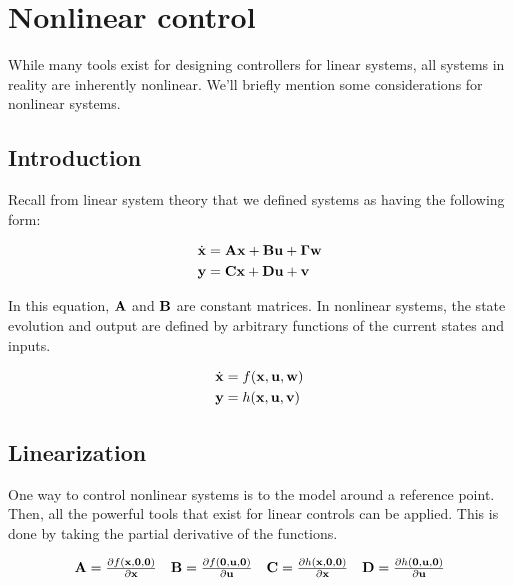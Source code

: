 
\chapter{Nonlinear control}
\label{ch:nonlinear_control}

While many tools exist for designing controllers for linear \glspl{system}, all
\glspl{system} in reality are inherently nonlinear. We'll briefly mention some
considerations for nonlinear \glspl{system}.

\section{Introduction}

Recall from linear \gls{system} theory that we defined \glspl{system} as having
the following form:

\begin{align*}
  \dot{\mathbf{x}} &= \mathbf{A}\mathbf{x} + \mathbf{B}\mathbf{u} + \mathbf{\Gamma}\mathbf{w} \\
  \mathbf{y} &= \mathbf{C}\mathbf{x} + \mathbf{D}\mathbf{u} + \mathbf{v}
\end{align*}

In this equation, $\mathbf{A}$ and $\mathbf{B}$ are constant matrices. In nonlinear
\glspl{system}, the \gls{state} evolution and \gls{output} are defined by
arbitrary functions of the current \glspl{state} and \glspl{input}.

\begin{align*}
  \dot{\mathbf{x}} &= f(\mathbf{x}, \mathbf{u}, \mathbf{w}) \\
  \mathbf{y} &= h(\mathbf{x}, \mathbf{u}, \mathbf{v})
\end{align*}

\section{Linearization}

One way to control nonlinear \glspl{system} is to
 the \gls{model} around a reference point.
Then, all the powerful tools that exist for linear controls can be applied. This
is done by taking the partial derivative of the functions.

\begin{align*}
  \begin{array}{cccc}
    \mathbf{A} = \frac{\partial f(\mathbf{x}, \mathbf{0}, \mathbf{0})}{\partial \mathbf{x}} &
    \mathbf{B} = \frac{\partial f(\mathbf{0}, \mathbf{u}, \mathbf{0})}{\partial \mathbf{u}} &
    \mathbf{C} = \frac{\partial h(\mathbf{x}, \mathbf{0}, \mathbf{0})}{\partial \mathbf{x}} &
    \mathbf{D} = \frac{\partial h(\mathbf{0}, \mathbf{u}, \mathbf{0})}{\partial \mathbf{u}}
  \end{array}
\end{align*}

